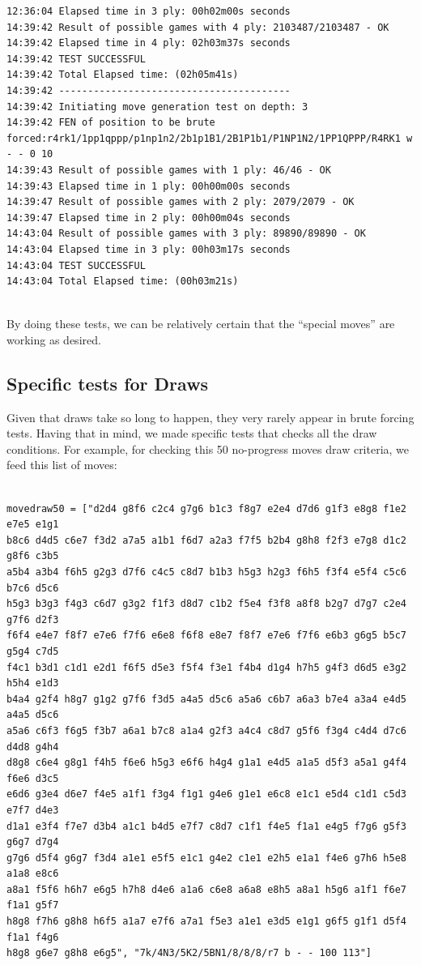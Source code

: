 \documentclass[10pt]{article}
\begin{document}
\begin{lstlisting}
12:36:04 Elapsed time in 3 ply: 00h02m00s seconds
14:39:42 Result of possible games with 4 ply: 2103487/2103487 - OK
14:39:42 Elapsed time in 4 ply: 02h03m37s seconds
14:39:42 TEST SUCCESSFUL
14:39:42 Total Elapsed time: (02h05m41s)
14:39:42 ----------------------------------------
14:39:42 Initiating move generation test on depth: 3
14:39:42 FEN of position to be brute forced:r4rk1/1pp1qppp/p1np1n2/2b1p1B1/2B1P1b1/P1NP1N2/1PP1QPPP/R4RK1 w - - 0 10
14:39:43 Result of possible games with 1 ply: 46/46 - OK
14:39:43 Elapsed time in 1 ply: 00h00m00s seconds
14:39:47 Result of possible games with 2 ply: 2079/2079 - OK
14:39:47 Elapsed time in 2 ply: 00h00m04s seconds
14:43:04 Result of possible games with 3 ply: 89890/89890 - OK
14:43:04 Elapsed time in 3 ply: 00h03m17s seconds
14:43:04 TEST SUCCESSFUL
14:43:04 Total Elapsed time: (00h03m21s)
    
\end{lstlisting}

By doing these tests, we can be relatively certain that the ``special moves'' are working
as desired.

\subsection{Specific tests for Draws}

Given that draws take so long to happen, they very rarely appear in brute forcing
tests. Having that in mind, we made specific tests that checks all the draw
conditions.  For example, for checking this 50 no-progress moves draw criteria, we feed this list of moves: 

\begin{lstlisting}

movedraw50 = ["d2d4 g8f6 c2c4 g7g6 b1c3 f8g7 e2e4 d7d6 g1f3 e8g8 f1e2 e7e5 e1g1
b8c6 d4d5 c6e7 f3d2 a7a5 a1b1 f6d7 a2a3 f7f5 b2b4 g8h8 f2f3 e7g8 d1c2 g8f6 c3b5
a5b4 a3b4 f6h5 g2g3 d7f6 c4c5 c8d7 b1b3 h5g3 h2g3 f6h5 f3f4 e5f4 c5c6 b7c6 d5c6
h5g3 b3g3 f4g3 c6d7 g3g2 f1f3 d8d7 c1b2 f5e4 f3f8 a8f8 b2g7 d7g7 c2e4 g7f6 d2f3
f6f4 e4e7 f8f7 e7e6 f7f6 e6e8 f6f8 e8e7 f8f7 e7e6 f7f6 e6b3 g6g5 b5c7 g5g4 c7d5
f4c1 b3d1 c1d1 e2d1 f6f5 d5e3 f5f4 f3e1 f4b4 d1g4 h7h5 g4f3 d6d5 e3g2 h5h4 e1d3
b4a4 g2f4 h8g7 g1g2 g7f6 f3d5 a4a5 d5c6 a5a6 c6b7 a6a3 b7e4 a3a4 e4d5 a4a5 d5c6
a5a6 c6f3 f6g5 f3b7 a6a1 b7c8 a1a4 g2f3 a4c4 c8d7 g5f6 f3g4 c4d4 d7c6 d4d8 g4h4
d8g8 c6e4 g8g1 f4h5 f6e6 h5g3 e6f6 h4g4 g1a1 e4d5 a1a5 d5f3 a5a1 g4f4 f6e6 d3c5
e6d6 g3e4 d6e7 f4e5 a1f1 f3g4 f1g1 g4e6 g1e1 e6c8 e1c1 e5d4 c1d1 c5d3 e7f7 d4e3
d1a1 e3f4 f7e7 d3b4 a1c1 b4d5 e7f7 c8d7 c1f1 f4e5 f1a1 e4g5 f7g6 g5f3 g6g7 d7g4
g7g6 d5f4 g6g7 f3d4 a1e1 e5f5 e1c1 g4e2 c1e1 e2h5 e1a1 f4e6 g7h6 h5e8 a1a8 e8c6
a8a1 f5f6 h6h7 e6g5 h7h8 d4e6 a1a6 c6e8 a6a8 e8h5 a8a1 h5g6 a1f1 f6e7 f1a1 g5f7
h8g8 f7h6 g8h8 h6f5 a1a7 e7f6 a7a1 f5e3 a1e1 e3d5 e1g1 g6f5 g1f1 d5f4 f1a1 f4g6
h8g8 g6e7 g8h8 e6g5", "7k/4N3/5K2/5BN1/8/8/8/r7 b - - 100 113"]

\end{lstlisting}
\end{document}
